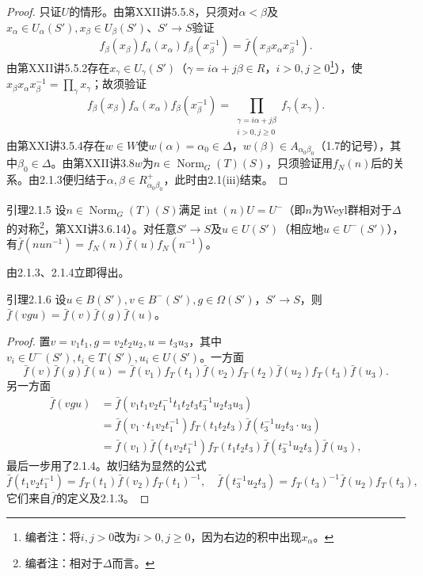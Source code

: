 \begin{proof}
只证$U$的情形。由第XXII讲5.5.8，只须对$\alpha<\beta$及$x_\alpha\in U_\alpha(S'),x_\beta\in U_\beta(S')$、$S'\to S$验证
\[f_\beta(x_\beta)f_\alpha(x_\alpha)f_\beta(x_\beta^{-1})=\bar f(x_\beta x_\alpha x_\beta^{-1}).\]
由第XXII讲5.5.2存在$x_\gamma\in U_\gamma(S')$（$\gamma=i\alpha+j\beta\in R$，$i>0,j\geq0$\footnote{编者注：将$i,j>0$改为$i>0,j\geq0$，因为右边的积中出现$x_\alpha$。}），使$x_\beta x_\alpha x_\beta^{-1}=\prod_\gamma x_\gamma$；故须验证
\[f_\beta(x_\beta)f_\alpha(x_\alpha)f_\beta(x_\beta^{-1})=\prod_{\substack{\gamma=i\alpha+j\beta\\i>0,j\geq0}}f_\gamma(x_\gamma).\]
由第XXI讲3.5.4存在$w\in W$使$w(\alpha)=\alpha_0\in\Delta$，$w(\beta)\in A_{\alpha_0\beta_0}$（1.7的记号），其中$\beta_0\in\Delta$。由第XXII讲3.8$w$为$n\in\operatorname{Norm}_G(T)(S)$，只须验证用$f_N(n)$后的关系。由2.1.3便归结于$\alpha,\beta\in R^+_{\alpha_0\beta_0}$，此时由2.1(iii)结束。
\end{proof}
\begin{SGAresult}{引理}{2.1.5}
设$n\in\operatorname{Norm}_G(T)(S)$满足$\operatorname{int}(n)U=U^-$（即$n$为Weyl群相对于$\Delta$的对称\footnote{编者注：相对于$\Delta$而言。}，第XXI讲3.6.14）。对任意$S'\to S$及$u\in U(S')$（相应地$u\in U^-(S')$），有$\bar f(nun^{-1})=f_N(n)\bar f(u)f_N(n^{-1})$。
\end{SGAresult}
由2.1.3、2.1.4立即得出。
\begin{SGAresult}{引理}{2.1.6}
设$u\in B(S'),v\in B^-(S'),g\in\Omega(S')$，$S'\to S$，则$\bar f(vgu)=\bar f(v)\bar f(g)\bar f(u)$。
\end{SGAresult}
\begin{proof}
置$v=v_1t_1,g=v_2t_2u_2,u=t_3u_3$，其中$v_i\in U^-(S'),t_i\in T(S'),u_i\in U(S')$。一方面
\[\bar f(v)\bar f(g)\bar f(u)=\bar f(v_1)f_T(t_1)\bar f(v_2)f_T(t_2)\bar f(u_2)f_T(t_3)\bar f(u_3).\]
另一方面
\[\begin{aligned}\bar f(vgu)&=\bar f(v_1t_1v_2t_1^{-1}t_1t_2t_3t_3^{-1}u_2t_3u_3)\\&=\bar f(v_1\cdot t_1v_2t_1^{-1})f_T(t_1t_2t_3)\bar f(t_3^{-1}u_2t_3\cdot u_3)\\&=\bar f(v_1)\bar f(t_1v_2t_1^{-1})f_T(t_1t_2t_3)\bar f(t_3^{-1}u_2t_3)\bar f(u_3),\end{aligned}\]
最后一步用了2.1.4。故归结为显然的公式
\[\bar f(t_1v_2t_1^{-1})=f_T(t_1)\bar f(v_2)f_T(t_1)^{-1},\quad \bar f(t_3^{-1}u_2t_3)=f_T(t_3)^{-1}\bar f(u_2)f_T(t_3),\]
它们来自$\bar f$的定义及2.1.3。
\end{proof}
